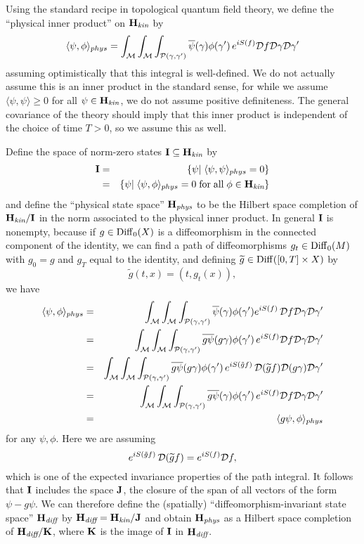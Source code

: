 \documentclass[12pt]{article}
\newcommand{\ban}{\begin{eqnarray*}}
\newcommand{\ean}{\end{eqnarray*}}
\newcommand{\M}{{\cal M}}
\renewcommand{\P}{{\cal P}}
\newcommand{\D}{{\cal D}}
\renewcommand{\H}{{\bf H}}
\newcommand{\I}{{\bf I}}
\newcommand{\J}{{\bf J}}
\newcommand{\K}{{\bf K}}
\newcommand{\Diff}{{\rm Diff}}
\begin{document}
Using the standard recipe in topological quantum field theory, we define
the ``physical inner product'' on $\H_{\textit{kin}}$ by
\[ \langle \psi,\phi \rangle_{phys} = \int_{\M} \int_{\M}
 \int_{\P(\gamma,\gamma')}
\overline\psi(\gamma) \phi(\gamma') \, e^{iS(f)} \D f \D\gamma \D\gamma'\]
assuming optimistically that this integral is well-defined.
We do not actually assume this is an inner product in the standard
sense, for while we assume
$\langle \psi,\psi \rangle \ge 0$ for all $\psi \in \H_{\textit{kin}}$, we do not
assume positive definiteness.
The general covariance of the theory should imply that this inner
product is independent of the choice of time $T > 0$, so we assume this
as well.

Define the space of norm-zero states $\I \subseteq \H_{\textit{kin}}$ by
\ban        \I &=& \{ \psi | \; \langle\psi,\psi\rangle_{phys} = 0\} \\
&=&   \{ \psi | \;  \langle\psi,\phi \rangle_{phys}
= 0 \;{\rm for \; all }\; \phi \in \H_{\textit{kin}} \}  \ean
and define the ``physical state space'' $\H_{\textit{phys}}$ to be the Hilbert
space completion of $\H_{\textit{kin}}/\I$ in the norm associated to the
physical inner product.
In general $\I$ is nonempty, because if $g \in \Diff_0(X)$ is a
diffeomorphism in the connected component of the identity,
we can find a path of diffeomorphisms
$g_t \in \Diff_0(M)$ with $g_0 = g$ and $g_T$ equal to the identity,
and defining
$\widetilde g \in \Diff([0,T] \times X)$ by
\[        \widetilde g(t,x) = (t,g_t(x)) ,\]
we have
\ban   \langle \psi,\phi\rangle_{phys} &=&
 \int_{\M} \int_{\M}
 \int_{\P(\gamma,\gamma')}
\overline\psi(\gamma) \phi(\gamma')e^{iS(f)}\, \D f  \D\gamma\D\gamma' \\
&=&   \int_{\M}  \int_{\M} \int_{\P(\gamma,\gamma')}
\overline{g\psi}(g\gamma) \phi(\gamma')\,  e^{iS(f)}  \D f\D\gamma\D\gamma' \\
&=&   \int_{\M}  \int_{\M}  \int_{\P(\gamma,\gamma')}
\overline{g\psi}(g\gamma) \phi(\gamma')\,  e^{iS(\tilde gf)}\, \D
(\widetilde gf)\D(g\gamma) \D\gamma' \\
&=&   \int_{\M} \int_{\M} \int_{\P(\gamma,\gamma')}
\overline{g\psi}(\gamma) \phi(\gamma')\, e^{iS(f)} \D f\D\gamma\D\gamma' \\
&=&    \langle g\psi,\phi\rangle_{phys}  \ean
for any $\psi,\phi$.   Here we are assuming
\[          e^{iS(\tilde gf)}\, \D(\widetilde gf) =  e^{iS(f)} \D f,\]
which is one of the expected invariance properties of the path
integral.
It follows that $\I$ includes the space $\J$, the closure of the
span of all vectors of
the form $\psi - g\psi$.  We can therefore define the (spatially)
``diffeomorphism-invariant state space'' $\H_{\textit{diff}}$ by
$\H_{\textit{diff}} = \H_{\textit{kin}} /\J $
and obtain $\H_{\textit{phys}}$ as a Hilbert space completion
of $\H_{\textit{diff}}/\K$, where $\K$ is the image of $\I$ in $\H_{\textit{diff}}$.
\end{document}
